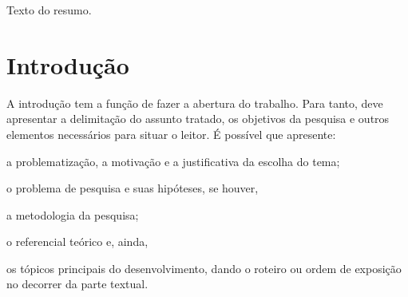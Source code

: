 \documentclass[12pt,oneside,a4paper,chapter=TITLE,section=TITLE,sumario
=tradicional]{abntex2}
\begin{document}

\imprimircapa
\imprimirfolhaderosto

\begin{resumo}
    Texto do resumo.
    
\end{resumo}

\sumario

\textual

\chapter{Introdução}
\label{cap:introducao}


A introdução tem a função de fazer a abertura do trabalho. Para tanto, deve 
apresentar a delimitação do assunto tratado, os objetivos da pesquisa e outros 
elementos necessários para situar o leitor. É possível que apresente:

\begin{lista}
    \item a problematização, a motivação e a justificativa da escolha do tema;
    \item o problema de pesquisa e suas hipóteses, se houver,
    \item a metodologia da pesquisa;
    \item o referencial teórico e, ainda,
    \item os tópicos principais do desenvolvimento, dando o roteiro ou
    ordem de exposição no decorrer da parte textual.
\end{lista}
\end{document}
